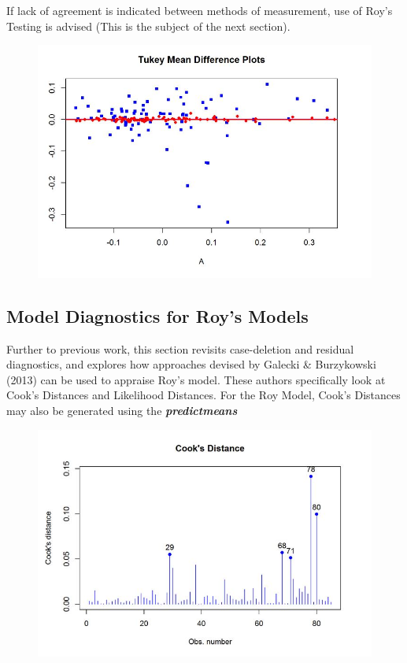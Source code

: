 \documentclass[12pt, a4paper]{report}
\theoremstyle{plain}
\theoremstyle{definition}
\theoremstyle{remark}
\begin{document}
	If lack of agreement is indicated between methods of measurement, use of Roy's Testing is advised (This is the subject of the next section).
	\begin{figure}[h!
		]
		\centering
		\includegraphics[width=0.7\linewidth]{images/04-TMDplot}
		
	\end{figure}
	

	
	
	
	

	



	\subsection{Model Diagnostics for Roy's Models}
	
	
	Further to previous work, this section revisits case-deletion and residual diagnostics, and explores how approaches devised by  Galecki \& Burzykowski (2013) can be used to appraise Roy's model. These authors specifically look at Cook's Distances and Likelihood Distances.
	For the Roy Model, Cook's Distances may also be generated using the \textbf{\textit{predictmeans}}
	
	
	
	\begin{figure}[h!]
		\centering
		\includegraphics[width=0.7\linewidth]{images/CooksDistancePlot-JS-Roy}
		\caption{}
		\label{fig:CooksDistancePlot-JS-Roy}
	\end{figure}
\end{document}
